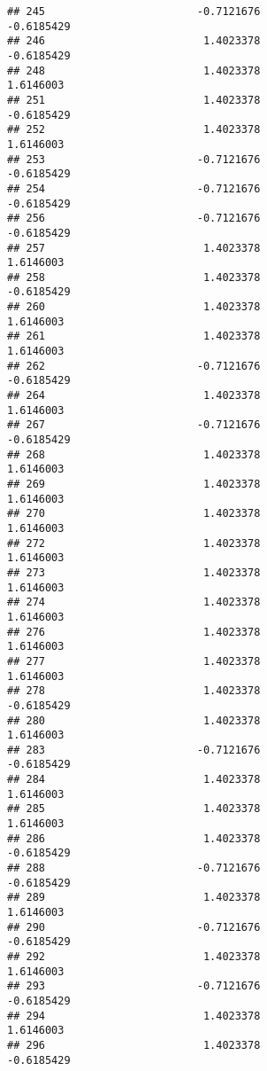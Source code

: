 \documentclass[
]{article}
\begin{document}
\begin{verbatim}
## 245                        -0.7121676                       -0.6185429
## 246                         1.4023378                       -0.6185429
## 248                         1.4023378                        1.6146003
## 251                         1.4023378                       -0.6185429
## 252                         1.4023378                        1.6146003
## 253                        -0.7121676                       -0.6185429
## 254                        -0.7121676                       -0.6185429
## 256                        -0.7121676                       -0.6185429
## 257                         1.4023378                        1.6146003
## 258                         1.4023378                       -0.6185429
## 260                         1.4023378                        1.6146003
## 261                         1.4023378                        1.6146003
## 262                        -0.7121676                       -0.6185429
## 264                         1.4023378                        1.6146003
## 267                        -0.7121676                       -0.6185429
## 268                         1.4023378                        1.6146003
## 269                         1.4023378                        1.6146003
## 270                         1.4023378                        1.6146003
## 272                         1.4023378                        1.6146003
## 273                         1.4023378                        1.6146003
## 274                         1.4023378                        1.6146003
## 276                         1.4023378                        1.6146003
## 277                         1.4023378                        1.6146003
## 278                         1.4023378                       -0.6185429
## 280                         1.4023378                        1.6146003
## 283                        -0.7121676                       -0.6185429
## 284                         1.4023378                        1.6146003
## 285                         1.4023378                        1.6146003
## 286                         1.4023378                       -0.6185429
## 288                        -0.7121676                       -0.6185429
## 289                         1.4023378                        1.6146003
## 290                        -0.7121676                       -0.6185429
## 292                         1.4023378                        1.6146003
## 293                        -0.7121676                       -0.6185429
## 294                         1.4023378                        1.6146003
## 296                         1.4023378                       -0.6185429

\end{verbatim}
\end{document}

